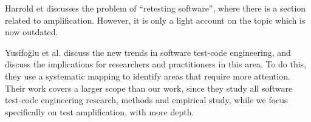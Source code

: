 Harrold et \etal\cite{harrold2008retesting} discusses the problem of ``retesting software'', where there is a section related to amplification.
However, it is only a light account on the topic which is now outdated.

Yusifoğlu et al. \cite{GAROUSIYUSIFOGLU2015123} discuss the new trends in software test-code engineering, and discuss the implications for researchers and practitioners in this area. 
To do this, they use a systematic mapping to identify areas that require more attention.
Their work covers a larger scope than our work, since they study all software test-code engineering research, methods and empirical study, while we focus specifically on test amplification, with more depth.